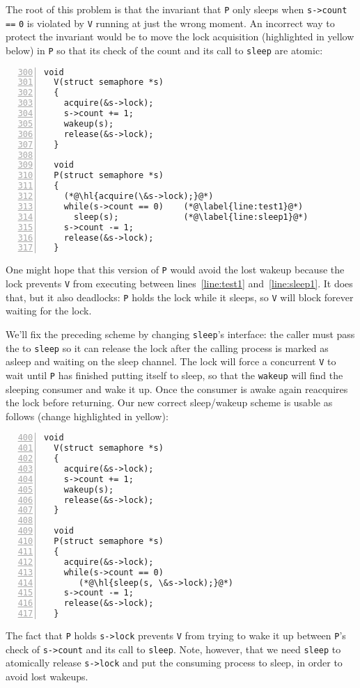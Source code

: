 The root of this problem is that the
invariant that
\lstinline{P}
only sleeps when
\lstinline{s->count}
\lstinline{==}
\lstinline{0}
is violated by 
\lstinline{V}
running at just the wrong moment.
An incorrect way to protect the invariant would be to 
move the lock acquisition (highlighted in yellow below) in
\lstinline{P}
so that its check of the count and its call to \lstinline{sleep}
are atomic:
\begin{lstlisting}[numbers=left,firstnumber=300]
  void
  V(struct semaphore *s)
  {
    acquire(&s->lock);
    s->count += 1;
    wakeup(s);
    release(&s->lock);
  }
  
  void
  P(struct semaphore *s)
  {
    (*@\hl{acquire(\&s->lock);}@*)
    while(s->count == 0)    (*@\label{line:test1}@*)
      sleep(s);             (*@\label{line:sleep1}@*)
    s->count -= 1;
    release(&s->lock);
  }
\end{lstlisting}
One might hope that this version of
\lstinline{P}
would avoid the lost wakeup because the lock prevents
\lstinline{V}
from executing between lines~\ref{line:test1} and~\ref{line:sleep1}.
It does that, but it also deadlocks:
\lstinline{P}
holds the lock while it sleeps,
so \lstinline{V} will block forever waiting for the lock.

We'll fix the preceding scheme by changing
\lstinline{sleep}'s
interface:
the caller must pass the  to
\lstinline{sleep}
so it can release the lock after
the calling process is marked as asleep and waiting on the
sleep channel.
The lock will force a concurrent
\lstinline{V}
to wait until \lstinline{P} has finished putting itself to sleep,
so that the
\lstinline{wakeup}
will find the sleeping consumer and wake it up.
Once the consumer is awake again
reacquires the lock before returning.
Our new correct sleep/wakeup scheme is usable as follows (change
highlighted in yellow):
\begin{lstlisting}[numbers=left,firstnumber=400]
  void
  V(struct semaphore *s)
  {
    acquire(&s->lock);
    s->count += 1;
    wakeup(s);
    release(&s->lock);
  }

  void
  P(struct semaphore *s)
  {
    acquire(&s->lock);
    while(s->count == 0)
       (*@\hl{sleep(s, \&s->lock);}@*)
    s->count -= 1;
    release(&s->lock);
  }
\end{lstlisting}

The fact that
\lstinline{P}
holds
\lstinline{s->lock}
prevents 
\lstinline{V}
from trying to wake it up between 
\lstinline{P}'s
check of
\lstinline{s->count}
and its call to
\lstinline{sleep}.
Note, however, that we need
\lstinline{sleep}
to atomically release
\lstinline{s->lock}
and put the consuming process to sleep,
in order to avoid lost wakeups.

